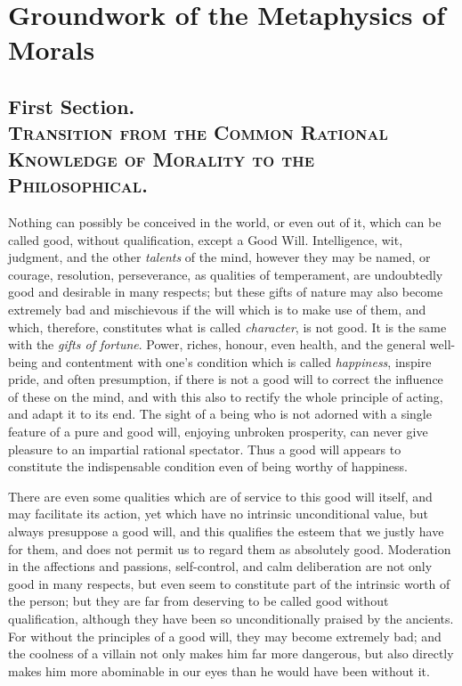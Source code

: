 
\author{Immanuel Kant}
\chapter[Groundwork of the Metaphysics of Morals, excerpt]{Groundwork
of the Metaphysics of Morals}

\section*{First Section.\\\smaller\textsc{Transition from the
Common Rational Knowledge of Morality to the Philosophical.}}

Nothing can possibly be conceived in the world, or even out of it,
which can be called good, without qualification, except a Good Will.
Intelligence, wit, judgment, and the other \textit{talents} of the
mind, however they may be named, or courage, resolution, perseverance,
as qualities of temperament, are undoubtedly good and desirable in
many respects; but these gifts of nature may also become extremely bad
and mischievous if the will which is to make use of them, and which,
therefore, constitutes what is called \textit{character}, is not good.
It is the same with the \textit{gifts of fortune}. Power, riches,
honour, even health, and the general well-being and contentment with
one's condition which is called \textit{happiness}, inspire pride, and
often presumption, if there is not a good will to correct the
influence of these on the mind, and with this also to rectify the
whole principle of acting, and adapt it to its end. The sight of a
being who is not adorned with a single feature of a pure and good
will, enjoying unbroken prosperity, can never give pleasure to an
impartial rational spectator. Thus a good will appears to constitute
the indispensable condition even of being worthy of happiness.

There are even some qualities which are of service to this good will
itself, and may facilitate its action, yet which have no intrinsic
unconditional value, but always presuppose a good will, and this
qualifies the esteem that we justly have for them, and does not permit
us to regard them as absolutely good. Moderation in the affections and
passions, self-control, and calm deliberation are not only good in
many respects, but even seem to constitute part of the intrinsic worth
of the person; but they are far from deserving to be called good
without  qualification, although they have been so
unconditionally praised by the ancients. For without the principles of
a good will, they may become extremely bad; and the coolness of a
villain not only makes him far more dangerous, but also directly makes
him more abominable in our eyes than he would have been without it.

